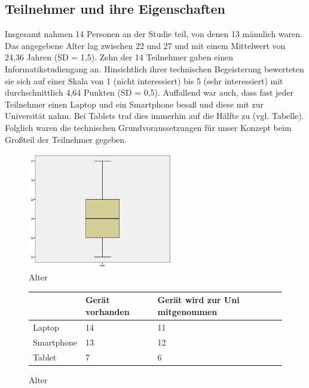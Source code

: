 \documentclass{chi-ext}
\begin{document}
\subsection{Teilnehmer und ihre Eigenschaften}

Insgesamt nahmen 14 Personen an der Studie teil, von denen 13 männlich waren. Das angegebene Alter lag zwischen 22 und 27 und mit einem Mittelwert von 24,36 Jahren (SD = 1,5). Zehn der 14 Teilnehmer gaben einen Informatikstudiengang an. Hinsichtlich ihrer technischen Begeisterung bewerteten sie sich auf einer Skala von 1 (nicht interessiert) bis 5 (sehr interessiert) mit durchschnittlich 4,64 Punkten (SD = 0,5).
Auffallend war auch, dass fast jeder Teilnehmer einen Laptop und ein Smartphone besaß und diese mit zur Universität nahm. Bei Tablets traf dies immerhin auf die Hälfte zu (vgl. Tabelle). Folglich waren die technischen Grundvoraussetzungen für unser Konzept beim Großteil der Teilnehmer gegeben.

\begin{figure}
  \centering
  \includegraphics[width=180pt]{img/studie/Alter.jpg}
  \caption{Alter}
  \label{fig:studie_alter}
\end{figure}

\begin{figure}
  \centering
\begin{tabular}{|l|p{1.5cm}|p{3cm}|}
\hline 
 & Gerät vorhanden & Gerät wird zur \newline Uni mitgenommen \\ 
\hline 
Laptop & 14 & 11 \\ 
\hline 
Smartphone & 13 & 12 \\ 
\hline 
Tablet & 7 & 6 \\ 
\hline 
\end{tabular} 
  \caption{Alter}
  \label{fig:studie_tabelle}
\end{figure}
\end{document}
